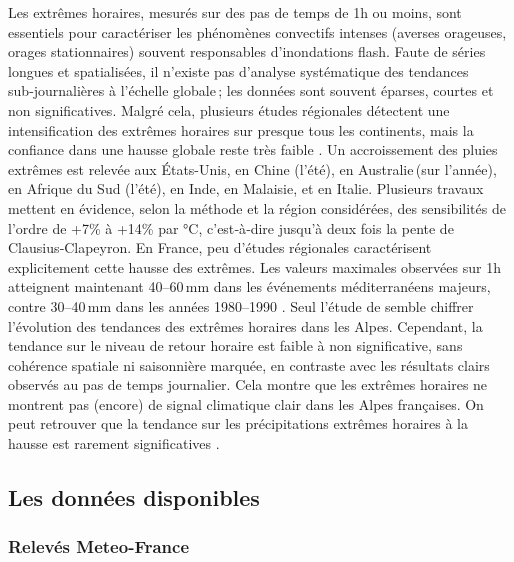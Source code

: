 \documentclass[
  article,
  nofooter,
  noheadings]{jss}
\begin{document}
Les extrêmes horaires, mesurés sur des pas de temps de 1h ou moins, sont
essentiels pour caractériser les phénomènes convectifs intenses (averses
orageuses, orages stationnaires) souvent responsables d'inondations
flash. Faute de séries longues et spatialisées, il n'existe pas
d'analyse systématique des tendances sub‑journalières à l'échelle
globale\,; les données sont souvent éparses, courtes et non
significatives. Malgré cela, plusieurs études régionales détectent une
intensification des extrêmes horaires sur presque tous les continents,
mais la confiance dans une hausse globale reste très faible
\citep{IPCC2021}. Un accroissement des pluies extrêmes est relevée aux
États-Unis, en Chine (l'été), en Australie\,(sur l'année), en Afrique du
Sud (l'été), en Inde, en Malaisie, et en Italie. Plusieurs travaux
mettent en évidence, selon la méthode et la région considérées, des
sensibilités de l'ordre de +7\% à +14\% par °C, c'est‑à‑dire jusqu'à
deux fois la pente de Clausius‑Clapeyron. En France, peu d'études
régionales caractérisent explicitement cette hausse des extrêmes. Les
valeurs maximales observées sur 1h atteignent maintenant 40--60\,mm dans
les événements méditerranéens majeurs, contre 30--40\,mm dans les années
1980--1990 \citep{meteofrance2024_episodesMediterraneens}. Seul l'étude
de \citet{Berghald2025} semble chiffrer l'évolution des tendances des
extrêmes horaires dans les Alpes. Cependant, la tendance sur le niveau
de retour horaire est faible à non significative, sans cohérence
spatiale ni saisonnière marquée, en contraste avec les résultats clairs
observés au pas de temps journalier. Cela montre que les extrêmes
horaires ne montrent pas (encore) de signal climatique clair dans les
Alpes françaises. On peut retrouver que la tendance sur les
précipitations extrêmes horaires à la hausse est rarement significatives
\citep{Soubeyroux01022015}.

\subsection{Les données disponibles}\label{les-donnuxe9es-disponibles}

\subsubsection{Relevés Meteo-France}\label{relevuxe9s-meteo-france}
\end{document}
